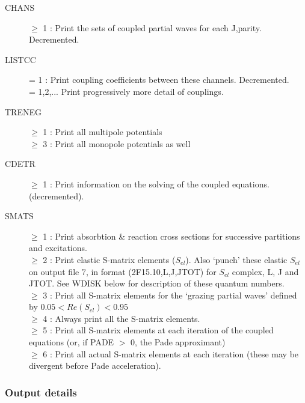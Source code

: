 \documentclass[11pt]{article}
\begin{document}
\begin{description}
\item[CHANS] $\geq$ 1 : Print the sets of coupled partial waves for each J,parity.
Decremented.

\item[LISTCC] = 1 : Print coupling coefficients between these channels. Decremented.
\\  = 1,2,... Print progressively more detail of couplings.
\item[TRENEG] $\geq$ 1 : Print all multipole potentials
\\  $\geq$ 3 : Print all monopole potentials as well
\item[CDETR]  $\geq$ 1 : Print information on the solving of the coupled equations.
(decremented).
\item[SMATS]  $\geq$ 1 : Print absorbtion \& reaction cross sections for successive
partitions and excitations.
\\  $\geq$ 2 : Print elastic S-matrix elements ($S_{el}$).
Also `punch' these elastic $S_{el}$ on output file 7,
in format (2F15.10,L,J,JTOT) for $S_{el}$ complex, L, J and JTOT.
See WDISK below for description of these quantum numbers.
\\  $\geq$ 3 : Print all S-matrix elements for the `grazing partial waves'
defined by $0.05 < Re(S_{el}) < 0.95$
\\  $\geq$ 4 : Always print all the S-matrix elements.
\\  $\geq$ 5 : Print all S-matrix elements at each iteration of the coupled
equations (or, if PADE  $>$ 0, the Pade approximant)
\\  $\geq$ 6 : Print all actual S-matrix elements at each iteration (these
may be divergent before Pade acceleration).


\end{description}

\subsubsection{Output details}
\end{document}
